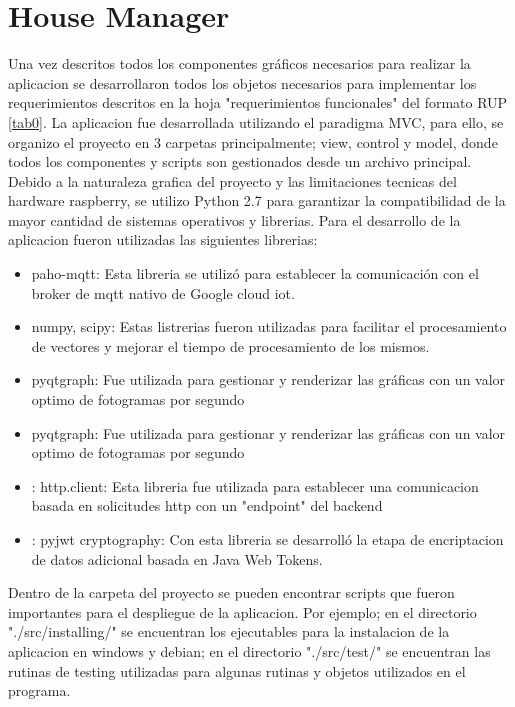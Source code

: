 \section{House Manager}

Una vez descritos todos los componentes gráficos necesarios para realizar la aplicacion se desarrollaron todos los objetos necesarios para implementar los requerimientos descritos en la hoja "requerimientos funcionales" del formato RUP \ref{tab0}. La aplicacion fue desarrollada utilizando el paradigma MVC, para ello, se organizo el proyecto en 3 carpetas principalmente; view, control y model, donde todos los componentes y scripts son gestionados desde un archivo principal. Debido a la naturaleza grafica del proyecto y las limitaciones tecnicas del hardware raspberry, se utilizo Python 2.7 para garantizar la compatibilidad de la mayor cantidad de sistemas operativos y librerias. 
Para el desarrollo de la aplicacion fueron utilizadas las siguientes librerias: 
\begin{itemize}
	\item paho-mqtt: Esta libreria se utilizó para establecer la comunicación con el broker de mqtt nativo de Google cloud iot.
	\item numpy, scipy: Estas listrerias fueron utilizadas para facilitar el procesamiento de vectores y mejorar el tiempo de procesamiento de los mismos.
	\item pyqtgraph: Fue utilizada para gestionar y renderizar las gráficas con un valor optimo de fotogramas por segundo
	\item pyqtgraph: Fue utilizada para gestionar y renderizar las gráficas con un valor optimo de fotogramas por segundo
	\item: http.client: Esta libreria fue utilizada para establecer una comunicacion basada en solicitudes http con un "endpoint" del backend
	\item: pyjwt cryptography: Con esta libreria se desarrolló la etapa de encriptacion de datos adicional basada en Java Web Tokens.	
\end{itemize}

Dentro de la carpeta del proyecto se pueden encontrar scripts que fueron importantes para el despliegue de la aplicacion. Por ejemplo; en el directorio "./src/installing/" se encuentran los ejecutables para la instalacion de la aplicacion en windows y debian; en el directorio "./src/test/" se encuentran las rutinas de testing utilizadas para algunas rutinas y objetos utilizados en el programa.

